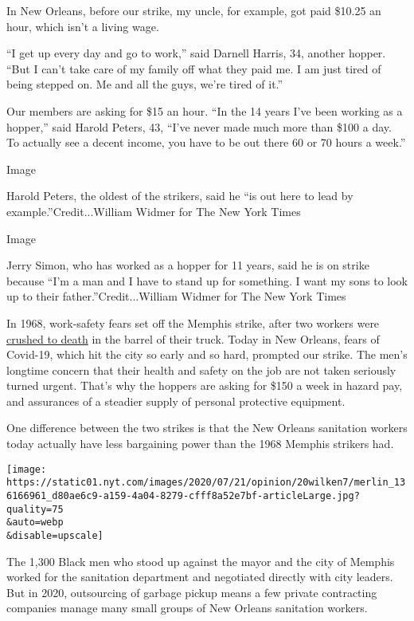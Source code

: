 In New Orleans, before our strike, my uncle, for example, got paid
\$10.25 an hour, which isn't a living wage.

``I get up every day and go to work,'' said Darnell Harris, 34, another
hopper. ``But I can't take care of my family off what they paid me. I am
just tired of being stepped on. Me and all the guys, we're tired of
it.''

Our members are asking for \$15 an hour. ``In the 14 years I've been
working as a hopper,'' said Harold Peters, 43, ``I've never made much
more than \$100 a day. To actually see a decent income, you have to be
out there 60 or 70 hours a week.''

Image

Harold Peters, the oldest of the strikers, said he ``is out here to lead
by example.''Credit...William Widmer for The New York Times

Image

Jerry Simon, who has worked as a hopper for 11 years, said he is on
strike because ``I'm a man and I have to stand up for something. I want
my sons to look up to their father.''Credit...William Widmer for The New
York Times

In 1968, work-safety fears set off the Memphis strike, after two workers
were
\href{https://www.theroot.com/watch-the-tragic-deaths-of-robert-walker-and-echol-col-1822619781}{crushed
to death} in the barrel of their truck. Today in New Orleans, fears of
Covid-19, which hit the city so early and so hard, prompted our strike.
The men's longtime concern that their health and safety on the job are
not taken seriously turned urgent. That's why the hoppers are asking for
\$150 a week in hazard pay, and assurances of a steadier supply of
personal protective equipment.

One difference between the two strikes is that the New Orleans
sanitation workers today actually have less bargaining power than the
1968 Memphis strikers had.

\texttt{[image: https://static01.nyt.com/images/2020/07/21/opinion/20wilken7/merlin\_136166961\_d80ae6c9-a159-4a04-8279-cfff8a52e7bf-articleLarge.jpg?quality=75\\\&auto=webp\\\&disable=upscale]}

The 1,300 Black men who stood up against the mayor and the city of
Memphis worked for the sanitation department and negotiated directly
with city leaders. But in 2020, outsourcing of garbage pickup means a
few private contracting companies manage many small groups of New
Orleans sanitation workers.

